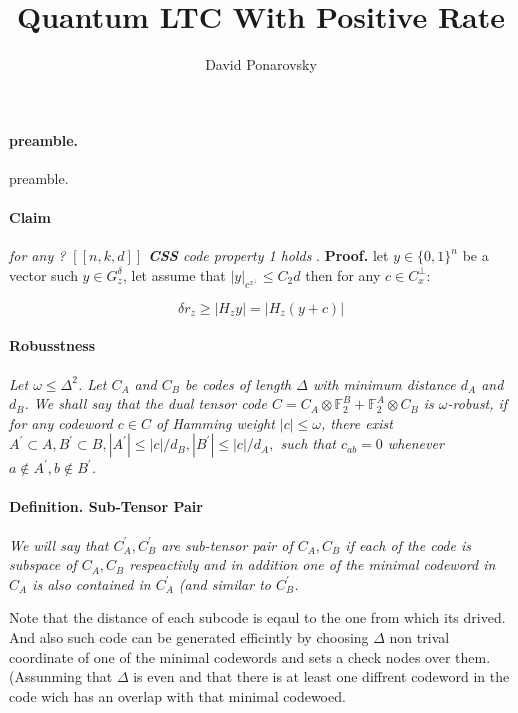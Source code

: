 \documentclass{article}
\newcommand{\Gz}{ G_{z}^{\delta} }
\begin{document}
\title{Quantum LTC With Positive Rate}
\author{David Ponarovsky}
\maketitle
\begin{multicols*}{2}


  \paragraph{preamble.} preamble.  
  \paragraph{Claim} \textit{ for any ?  $ \left[ \left[ n,k,d \right] \right] $ \textbf{CSS} code property 1 holds }. 
\textbf{Proof.} let $y \in \{0,1\}^{n}$ be a vector such $ y \in \Gz $, let assume that $|y|_{c^{x^{\perp}}} \le C_{2} d$ then for any $ c \in C_{x}^{\perp}$: 

\begin{equation*}
    \delta r_z \ge | H_{z} y | = | H_{z} \left( y + c \right) |  
\end{equation*}
\paragraph{Robusstness} \textit{ Let $ \omega \le \Delta^{2}$. Let $C_{A}$ and $C_{B}$ be codes of length $\Delta$ with minimum distance $d_{A}$ and $d_{B}$. We shall say that the dual tensor code $C = C_{A}\otimes \mathbb{F}^{B}_{2} + \mathbb{F}^{A}_{2} \otimes C_{B}$ is $\omega$-robust, if for any codeword $c\in C$ of Hamming weight $|c|\le \omega$, there exist $A^{\prime}\subset A, B^{\prime}\subset B, |A^{\prime}|\le |c|/d_{B}, |B^{\prime}|\le |c|/d_{A},$ such that $c_{ab}=0$ whenever $a \notin A^{\prime}, b \notin B^{\prime}$.} 
\paragraph{Definition. Sub-Tensor Pair} \textit{ We will say that $C_{A}^{\prime}, C_{B}^{\prime}$ are sub-tensor pair of $C_A,C_B$ if each of the code is subspace of $C_A, C_B$ respeactivly and in addition one of the  minimal codeword in $C_{A}$ is also contained in $C_{A}^{\prime}$ (and similar to $C_{B}^{\prime}$.}

  Note that the distance of each subcode is eqaul to the one from which its drived. And also such code can be generated efficintly by choosing $\Delta$ non trival coordinate of one of the minimal codewords and sets a check nodes over them. (Assunming that $\Delta$ is even and that there is at least one diffrent codeword in the code wich has an overlap with that minimal codewoed.    

\end{multicols*}
\end{document}
